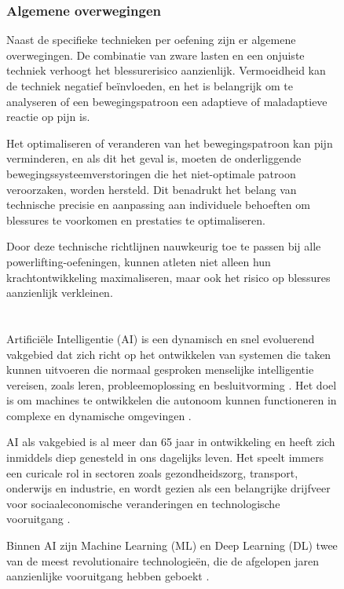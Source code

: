 \begin{figure}[h]
\subsubsection{Algemene overwegingen}
Naast de specifieke technieken per oefening zijn er algemene overwegingen. De combinatie van zware lasten en een onjuiste techniek verhoogt het blessurerisico aanzienlijk. 
Vermoeidheid kan de techniek negatief beïnvloeden, en het is belangrijk om te analyseren of een bewegingspatroon een adaptieve of maladaptieve reactie op pijn is.

Het optimaliseren of veranderen van het bewegingspatroon kan pijn verminderen, en als dit het geval is, moeten de onderliggende bewegingssysteemverstoringen die het niet-optimale patroon veroorzaken, worden hersteld. 
Dit benadrukt het belang van technische precisie en aanpassing aan individuele behoeften om blessures te voorkomen en prestaties te optimaliseren\cite{tymchik2021}.

\medskip

Door deze technische richtlijnen nauwkeurig toe te passen bij alle powerlifting-oefeningen, kunnen atleten niet alleen hun krachtontwikkeling maximaliseren, maar ook het risico op blessures aanzienlijk verkleinen.

\section{}%
\label{sec:artificiële-intelligentie}

Artificiële Intelligentie (AI) is een dynamisch en snel evoluerend vakgebied dat zich richt op het ontwikkelen van systemen die taken kunnen uitvoeren die normaal gesproken menselijke intelligentie vereisen, zoals leren, probleemoplossing en besluitvorming \autocite{SharifaniEtAl2023}.
Het doel is om machines te ontwikkelen die autonoom kunnen functioneren in complexe en dynamische omgevingen \autocite{Kouassi2023}.

\medskip

AI als vakgebied is al meer dan 65 jaar in ontwikkeling en heeft zich inmiddels diep genesteld in ons dagelijks leven. Het speelt immers een curicale rol in sectoren zoals gezondheidszorg, transport, onderwijs en industrie, en wordt gezien als een belangrijke drijfveer voor sociaaleconomische veranderingen en technologische vooruitgang \autocite{JiangEtAl2022}.

\medskip

Binnen AI zijn Machine Learning (ML) en Deep Learning (DL) twee van de meest revolutionaire technologieën, die de afgelopen jaren aanzienlijke vooruitgang hebben geboekt \autocite{SharifaniEtAl2023}.


\end{figure}
